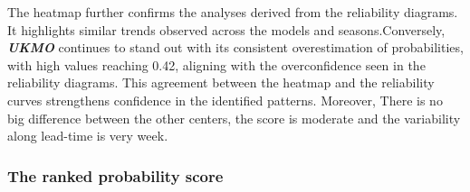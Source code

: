The heatmap further confirms the analyses derived from the reliability diagrams. It highlights similar trends observed across the models and seasons.Conversely, \textbf{\textit{UKMO}} continues to stand out with its consistent overestimation of probabilities, with high values reaching 0.42, aligning with the overconfidence seen in the reliability diagrams. This agreement between the heatmap and the reliability curves strengthens confidence in the identified patterns. Moreover, There is no big difference between the other centers, the score is moderate and the variability along lead-time is very week.




\subsubsection{The ranked probability score}

